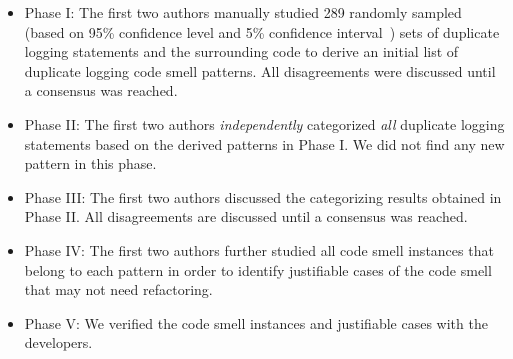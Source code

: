 \begin{itemize}
	\item Phase I: The first two authors manually studied 289 randomly sampled (based on 95\% confidence level and 5\% confidence interval~\cite{boslaugh2008statistics}) sets of duplicate logging statements and the surrounding code to derive an initial list of duplicate logging code smell patterns. All disagreements were discussed until a consensus was reached.  %
	\item Phase II: The first two authors {\em independently} categorized {\em all} duplicate logging statements based on the derived patterns in Phase I. We did not find any new pattern in this phase. 
	\item Phase III: The first two authors discussed the categorizing results obtained in Phase II. All disagreements are discussed until a consensus was reached. 
	\item Phase IV: The first two authors further studied all code smell instances that belong to each pattern in order to identify justifiable cases of the code smell that may not need refactoring.
	\item Phase V: We verified the code smell instances and justifiable cases with the developers. 
\end{itemize}









